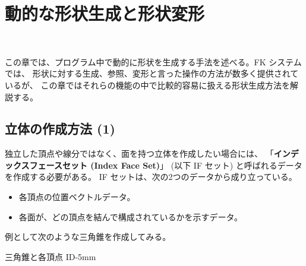 \chapter{動的な形状生成と形状変形} \label{chap:easygen} ~

この章では、プログラム中で動的に形状を生成する手法を述べる。FK システムでは、
形状に対する生成、参照、変形と言った操作の方法が数多く提供されているが、
この章ではそれらの機能の中で比較的容易に扱える形状生成方法を解説する。

\section{立体の作成方法 (1)} \label{sec:solidGen1}
独立した頂点や線分ではなく、面を持つ立体を作成したい場合には、
「\textbf{インデックスフェースセット (Index Face Set)}」
(以下 IF セット) と呼ばれるデータを作成する必要がある。
IF セットは、次の2つのデータから成り立っている。
\begin{itemize}
 \item 各頂点の位置ベクトルデータ。
 \item 各面が、どの頂点を結んで構成されているかを示すデータ。
\end{itemize}
例として次のような三角錐を作成してみる。

	{三角錐と各頂点 ID}{-5mm}

